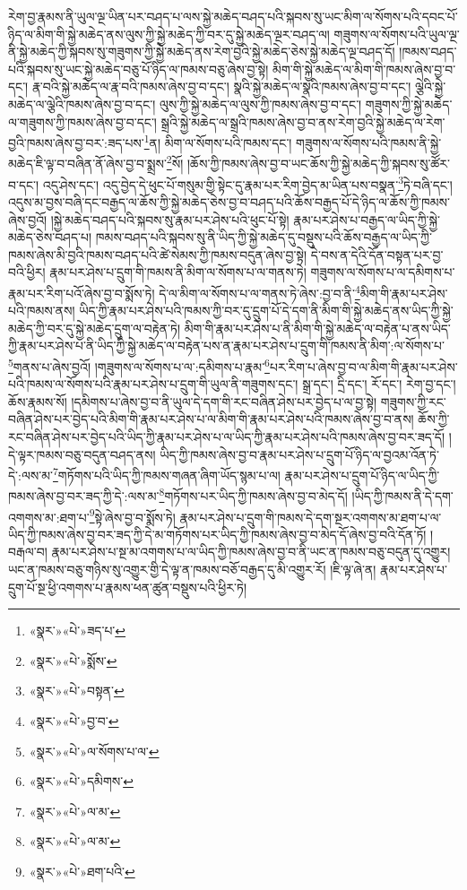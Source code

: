 རེག་བྱ་རྣམས་ནི་ཡུལ་ལྔ་ཡིན་པར་བཤད་པ་ལས་སྐྱེ་མཆེད་བཤད་པའི་སྐབས་སུ་ཡང་མིག་ལ་སོགས་པའི་དབང་པོ་ཉིད་ལ་མིག་གི་སྐྱེ་མཆེད་ནས་ལུས་ཀྱི་སྐྱེ་མཆེད་ཀྱི་བར་དུ་སྐྱེ་མཆེད་ལྔར་བཤད་ལ། གཟུགས་ལ་སོགས་པའི་ཡུལ་ལྔ་ནི་སྐྱེ་མཆེད་ཀྱི་སྐབས་སུ་གཟུགས་ཀྱི་སྐྱེ་མཆེད་ནས་རེག་བྱའི་སྐྱེ་མཆེད་ཅེས་སྐྱེ་མཆེད་ལྔ་བཤད་དོ། །ཁམས་བཤད་པའི་སྐབས་སུ་ཡང་སྐྱེ་མཆེད་བཅུ་པོ་ཉིད་ལ་ཁམས་བཅུ་ཞེས་བྱ་སྟེ། མིག་གི་སྐྱེ་མཆེད་ལ་མིག་གི་ཁམས་ཞེས་བྱ་བ་དང་། རྣ་བའི་སྐྱེ་མཆེད་ལ་རྣ་བའི་ཁམས་ཞེས་བྱ་བ་དང་། སྣའི་སྐྱེ་མཆེད་ལ་སྣའི་ཁམས་ཞེས་བྱ་བ་དང་། ལྕེའི་སྐྱེ་མཆེད་ལ་ལྕེའི་ཁམས་ཞེས་བྱ་བ་དང་། ལུས་ཀྱི་སྐྱེ་མཆེད་ལ་ལུས་ཀྱི་ཁམས་ཞེས་བྱ་བ་དང་། གཟུགས་ཀྱི་སྐྱེ་མཆེད་ལ་གཟུགས་ཀྱི་ཁམས་ཞེས་བྱ་བ་དང་། སྒྲའི་སྐྱེ་མཆེད་ལ་སྒྲའི་ཁམས་ཞེས་བྱ་བ་ནས་རེག་བྱའི་སྐྱེ་མཆེད་ལ་རེག་བྱའི་ཁམས་ཞེས་བྱ་བར་:ཟད་པས་\footnote{«སྣར་»«པེ་»ཟད་པ་}ན། མིག་ལ་སོགས་པའི་ཁམས་དང་། གཟུགས་ལ་སོགས་པའི་ཁམས་ནི་སྐྱེ་མཆེད་ཇི་ལྟ་བ་བཞིན་ནོ་ཞེས་བྱ་བ་སྨྲས་\footnote{«སྣར་»«པེ་»སྨོས་}སོ། །ཆོས་ཀྱི་ཁམས་ཞེས་བྱ་བ་ཡང་ཆོས་ཀྱི་སྐྱེ་མཆེད་ཀྱི་སྐབས་སུ་ཚོར་བ་དང་། འདུ་ཤེས་དང་། འདུ་བྱེད་དེ་ཕུང་པོ་གསུམ་གྱི་སྟེང་དུ་རྣམ་པར་རིག་བྱེད་མ་ཡིན་པས་བསྣན་\footnote{«སྣར་»«པེ་»བསྟན་}ཏེ་བཞི་དང་། འདུས་མ་བྱས་བཞི་དང་བརྒྱད་ལ་ཆོས་ཀྱི་སྐྱེ་མཆེད་ཅེས་བྱ་བ་བཤད་པའི་ཆོས་བརྒྱད་པོ་དེ་ཉིད་ལ་ཆོས་ཀྱི་ཁམས་ཞེས་བྱའོ། །སྐྱེ་མཆེད་བཤད་པའི་སྐབས་སུ་རྣམ་པར་ཤེས་པའི་ཕུང་པོ་སྟེ། རྣམ་པར་ཤེས་པ་བརྒྱད་ལ་ཡིད་ཀྱི་སྐྱེ་མཆེད་ཅེས་བཤད་པ། ཁམས་བཤད་པའི་སྐབས་སུ་ནི་ཡིད་ཀྱི་སྐྱེ་མཆེད་དུ་བསྡུས་པའི་ཆོས་བརྒྱད་ལ་ཡིད་ཀྱི་ཁམས་ཞེས་མི་བྱའི་ཁམས་བཤད་པའི་ཚེ་སེམས་ཀྱི་ཁམས་བདུན་ཞེས་བྱ་སྟེ། དེ་བས་ན་དེའི་དོན་བསྟན་པར་བྱ་བའི་ཕྱིར། རྣམ་པར་ཤེས་པ་དྲུག་གི་ཁམས་ནི་མིག་ལ་སོགས་པ་ལ་གནས་ཏེ། གཟུགས་ལ་སོགས་པ་ལ་དམིགས་པ་རྣམ་པར་རིག་པའོ་ཞེས་བྱ་བ་སྨོས་ཏེ། དེ་ལ་མིག་ལ་སོགས་པ་ལ་གནས་ཏེ་ཞེས་:བྱ་བ་ནི་\footnote{«སྣར་»«པེ་»བྱ་བ་}མིག་གི་རྣམ་པར་ཤེས་པའི་ཁམས་ནས། ཡིད་ཀྱི་རྣམ་པར་ཤེས་པའི་ཁམས་ཀྱི་བར་དུ་དྲུག་པོ་དེ་དག་ནི་མིག་གི་སྐྱེ་མཆེད་ནས་ཡིད་ཀྱི་སྐྱེ་མཆེད་ཀྱི་བར་དུ་སྐྱེ་མཆེད་དྲུག་ལ་བརྟེན་ཏེ། མིག་གི་རྣམ་པར་ཤེས་པ་ནི་མིག་གི་སྐྱེ་མཆེད་ལ་བརྟེན་པ་ནས་ཡིད་ཀྱི་རྣམ་པར་ཤེས་པ་ནི་ཡིད་ཀྱི་སྐྱེ་མཆེད་ལ་བརྟེན་པས་ན་རྣམ་པར་ཤེས་པ་དྲུག་གི་ཁམས་ནི་མིག་:ལ་སོགས་པ་\footnote{«སྣར་»«པེ་»ལ་སོགས་པ་ལ་}གནས་པ་ཞེས་བྱའོ། །གཟུགས་ལ་སོགས་པ་ལ་:དམིགས་པ་རྣམ་\footnote{«སྣར་»«པེ་»དམིགས་}པར་རིག་པ་ཞེས་བྱ་བ་ལ་མིག་གི་རྣམ་པར་ཤེས་པའི་ཁམས་ལ་སོགས་པའི་རྣམ་པར་ཤེས་པ་དྲུག་གི་ཡུལ་ནི་གཟུགས་དང་། སྒྲ་དང་། དྲི་དང་། རོ་དང་། རེག་བྱ་དང་། ཆོས་རྣམས་སོ། །དམིགས་པ་ཞེས་བྱ་བ་ནི་ཡུལ་དེ་དག་གི་རང་བཞིན་ཤེས་པར་བྱེད་པ་ལ་བྱ་སྟེ། གཟུགས་ཀྱི་རང་བཞིན་ཤེས་པར་བྱེད་པའི་མིག་གི་རྣམ་པར་ཤེས་པ་ལ་མིག་གི་རྣམ་པར་ཤེས་པའི་ཁམས་ཞེས་བྱ་བ་ནས། ཆོས་ཀྱི་རང་བཞིན་ཤེས་པར་བྱེད་པའི་ཡིད་ཀྱི་རྣམ་པར་ཤེས་པ་ལ་ཡིད་ཀྱི་རྣམ་པར་ཤེས་པའི་ཁམས་ཞེས་བྱ་བར་ཟད་དོ། །དེ་ལྟར་ཁམས་བཅུ་བདུན་བཤད་ནས། ཡིད་ཀྱི་ཁམས་ཞེས་བྱ་བ་རྣམ་པར་ཤེས་པ་དྲུག་པོ་ཉིད་ལ་བྱའམ་འོན་ཏེ་དེ་:ལས་མ་\footnote{«སྣར་»«པེ་»ལ་མ་}གཏོགས་པའི་ཡིད་ཀྱི་ཁམས་གཞན་ཞིག་ཡོད་སྙམ་པ་ལ། རྣམ་པར་ཤེས་པ་དྲུག་པོ་ཉིད་ལ་ཡིད་ཀྱི་ཁམས་ཞེས་བྱ་བར་ཟད་ཀྱི་དེ་:ལས་མ་\footnote{«སྣར་»«པེ་»ལ་མ་}གཏོགས་པར་ཡིད་ཀྱི་ཁམས་ཞེས་བྱ་བ་མེད་དོ། །ཡིད་ཀྱི་ཁམས་ནི་དེ་དག་འགགས་མ་:ཐག་པ་\footnote{«སྣར་»«པེ་»ཐག་པའི་}སྟེ་ཞེས་བྱ་བ་སྨོས་ཏེ། རྣམ་པར་ཤེས་པ་དྲུག་གི་ཁམས་དེ་དག་སྔར་འགགས་མ་ཐག་པ་ལ་ཡིད་ཀྱི་ཁམས་ཞེས་བྱ་བར་ཟད་ཀྱི་དེ་མ་གཏོགས་པར་ཡིད་ཀྱི་ཁམས་ཞེས་བྱ་བ་མེད་དོ་ཞེས་བྱ་བའི་དོན་ཏོ། །བརྒལ་བ། རྣམ་པར་ཤེས་པ་སྔ་མ་འགགས་པ་ལ་ཡིད་ཀྱི་ཁམས་ཞེས་བྱ་བ་ནི་ཡང་ན་ཁམས་བཅུ་བདུན་དུ་འགྱུར། ཡང་ན་ཁམས་བཅུ་གཉིས་སུ་འགྱུར་གྱི་དེ་ལྟ་ན་ཁམས་བཅོ་བརྒྱད་དུ་མི་འགྱུར་རོ། །ཇི་ལྟ་ཞེ་ན། རྣམ་པར་ཤེས་པ་དྲུག་པོ་སྔ་ཕྱི་འགགས་པ་རྣམས་ཕན་ཚུན་བསྡུས་པའི་ཕྱིར་ཏེ། 